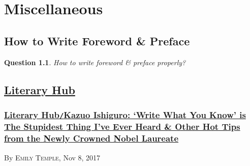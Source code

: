 \documentclass[oneside]{book}
\numberwithin{equation}{section}
\newtheorem{question}{Question}[chapter]
\begin{document}

\part{Miscellaneous}

\chapter{How to Write Foreword \& Preface}

\begin{question}
	How to write foreword \& preface properly?
\end{question}


\chapter{\href{https://lithub.com/}{Literary Hub}}

\section{\href{https://lithub.com/kazuo-ishiguro-write-what-you-know-is-the-stupidest-thing-ive-ever-heard/}{Literary Hub\texttt{/}Kazuo Ishiguro: `Write What You Know' is The Stupidest Thing I've Ever Heard \& Other Hot Tips from the Newly Crowned Nobel Laureate}}
\hfill By \textsc{Emily Temple}, Nov 8, 2017
\end{document}
